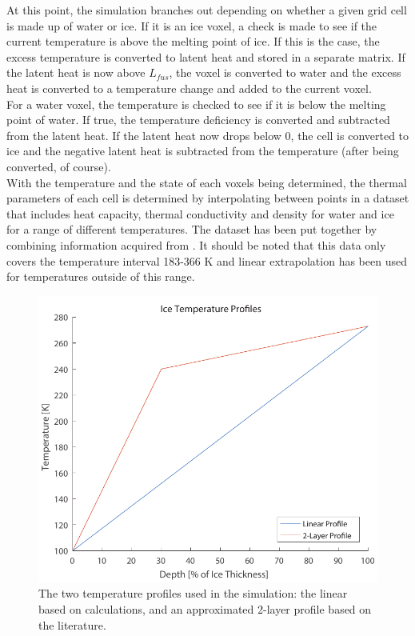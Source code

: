 \noindent
At this point, the simulation branches out depending on whether a given grid cell is made up of water or ice. If it is an ice voxel, a check is made to see if the current temperature is above the melting point of ice. If this is the case, the excess temperature is converted to latent heat and stored in a separate matrix. If the latent heat is now above $L_{fus}$, the voxel is converted to water and the excess heat is converted to a temperature change and added to the current voxel.\\

\noindent
For a water voxel, the temperature is checked to see if it is below the melting point of water. If true, the temperature deficiency is converted and subtracted from the latent heat. If the latent heat now drops below 0, the cell is converted to ice and the negative latent heat is subtracted from the temperature (after being converted, of course).\\

\noindent
With the temperature and the state of each voxels being determined, the thermal parameters of each cell is determined by interpolating between points in a dataset that includes heat capacity, thermal conductivity and density for water and ice for a range of different temperatures. The dataset has been put together by combining information acquired from \cite{website:engineeringToolbox}. It should be noted that this data only covers the temperature interval 183-366 K and linear extrapolation has been used for temperatures outside of this range.\\

\begin{figure}[ht]
	\centering
	\includegraphics[width=.5\textwidth]{figures/LAMC/iceTempProfiles.pdf}
	\caption{The two temperature profiles used in the simulation: the linear based on calculations, and an approximated 2-layer profile based on the literature.}
	\label{fig:iceTempProfiles}
\end{figure}

